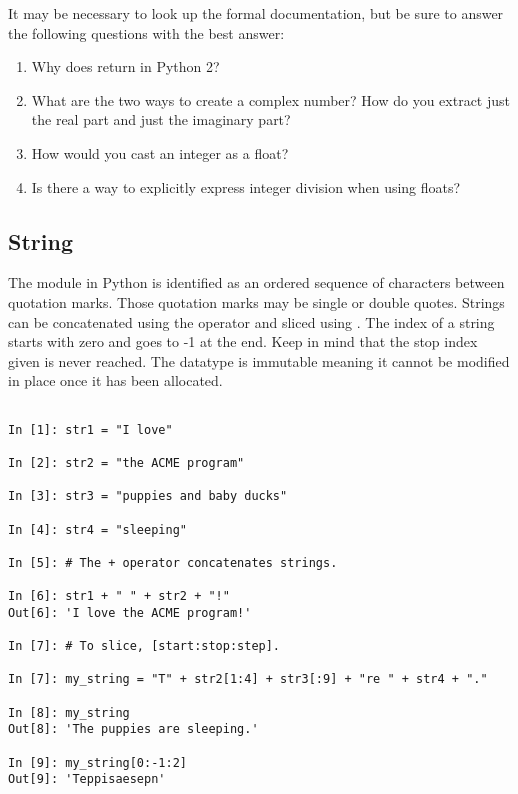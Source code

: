 \begin{problem}
It may be necessary to look up the formal documentation, but be sure to 
answer the following questions with the best answer:

\begin{enumerate}

\item Why does  return  in Python 2? 
\item What are the two ways to create a complex number? 
How do you extract just the real part and just the imaginary part?
\item How would you cast an integer as a float?
\item Is there a way to explicitly express integer division when using floats?
\end{enumerate}
\end{problem}

\subsection*{String}
\begin{example}

The  module in Python is identified as an ordered sequence of characters 
between quotation marks. Those quotation marks may be single or double quotes. 
Strings can be concatenated using the \li{+} operator and sliced using \li{[ ]}.
The index of a string starts with zero and goes to -1 at the end. Keep in mind 
that the stop index given is never reached. 
The  datatype is immutable meaning it cannot be modified in place once 
it has been allocated. 

\begin{lstlisting}

In [1]: str1 = "I love"

In [2]: str2 = "the ACME program"

In [3]: str3 = "puppies and baby ducks"

In [4]: str4 = "sleeping"

In [5]: # The + operator concatenates strings.

In [6]: str1 + " " + str2 + "!"
Out[6]: 'I love the ACME program!'

In [7]: # To slice, [start:stop:step].

In [7]: my_string = "T" + str2[1:4] + str3[:9] + "re " + str4 + "."

In [8]: my_string
Out[8]: 'The puppies are sleeping.'

In [9]: my_string[0:-1:2]
Out[9]: 'Teppisaesepn'

\end{lstlisting}
\end{example}

